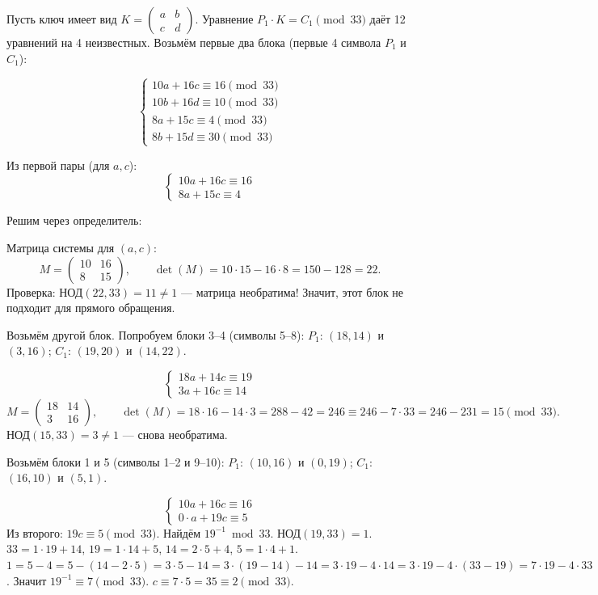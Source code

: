 Пусть ключ имеет вид $K = \begin{pmatrix} a & b \\ c & d \end{pmatrix}$. Уравнение $P_1 \cdot K = C_1 \pmod{33}$ даёт 12 уравнений на 4 неизвестных. Возьмём первые два блока (первые 4 символа $P_1$ и $C_1$):

\[
\begin{cases}
10 a + 16 c \equiv 16 \pmod{33} \\
10 b + 16 d \equiv 10 \pmod{33} \\
8 a + 15 c \equiv 4 \pmod{33} \\
8 b + 15 d \equiv 30 \pmod{33}
\end{cases}
\]

Из первой пары (для $a, c$):
\[
\begin{cases}
10 a + 16 c \equiv 16 \\
8 a + 15 c \equiv 4
\end{cases}
\]

Решим через определитель:

Матрица системы для $(a, c)$:
\[
M = \begin{pmatrix} 10 & 16 \\ 8 & 15 \end{pmatrix}, \qquad \det(M) = 10\cdot 15 - 16\cdot 8 = 150 - 128 = 22.
\]
Проверка: $\text{НОД}(22, 33) = 11 \neq 1$ — матрица необратима! Значит, этот блок не подходит для прямого обращения.

Возьмём другой блок. Попробуем блоки 3–4 (символы 5–8): $P_1$: $(18,14)$ и $(3,16)$; $C_1$: $(19,20)$ и $(14,22)$.

\[
\begin{cases}
18 a + 14 c \equiv 19 \\
3 a + 16 c \equiv 14
\end{cases}
\]
\[
M = \begin{pmatrix} 18 & 14 \\ 3 & 16 \end{pmatrix}, \qquad \det(M) = 18\cdot 16 - 14\cdot 3 = 288 - 42 = 246 \equiv 246 - 7\cdot 33 = 246 - 231 = 15 \pmod{33}.
\]
$\text{НОД}(15, 33) = 3 \neq 1$ — снова необратима.

Возьмём блоки 1 и 5 (символы 1–2 и 9–10): $P_1$: $(10,16)$ и $(0,19)$; $C_1$: $(16,10)$ и $(5,1)$.

\[
\begin{cases}
10 a + 16 c \equiv 16 \\
0\cdot a + 19 c \equiv 5
\end{cases}
\]
Из второго: $19 c \equiv 5 \pmod{33}$. Найдём $19^{-1} \bmod 33$. $\text{НОД}(19,33)=1$.
$33 = 1\cdot 19 + 14$, $19 = 1\cdot 14 + 5$, $14 = 2\cdot 5 + 4$, $5 = 1\cdot 4 + 1$.
$1 = 5 - 4 = 5 - (14 - 2\cdot 5) = 3\cdot 5 - 14 = 3\cdot(19-14) - 14 = 3\cdot 19 - 4\cdot 14 = 3\cdot 19 - 4\cdot(33 - 19) = 7\cdot 19 - 4\cdot 33$.
Значит $19^{-1} \equiv 7 \pmod{33}$.
$c \equiv 7\cdot 5 = 35 \equiv 2 \pmod{33}$.

